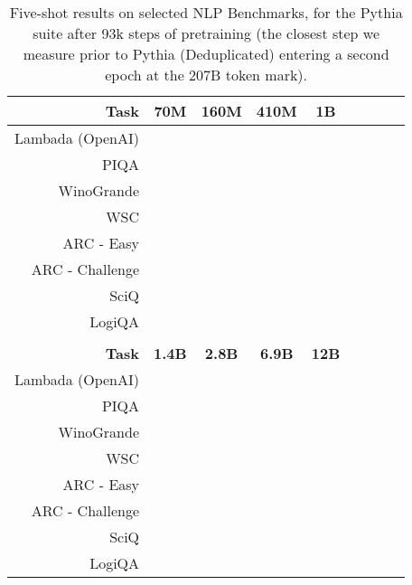 \documentclass{article}
\theoremstyle{plain}
\theoremstyle{definition}
\theoremstyle{remark}
\begin{document}
\begin{table}[H]
\centering
\begin{tabular}{rcccccccc}
\toprule
\textbf{Task} & \textbf{70M} & \textbf{160M} & \textbf{410M} & \textbf{1B} \\
\midrule
Lambada (OpenAI) &  &  &  &  \\
PIQA &  &  &  &  \\
WinoGrande &  &  &  &  \\
WSC &  &  &  &  \\
ARC - Easy &  &  &  &  \\
ARC - Challenge &  &  &  &  \\
SciQ &  &  &  &  \\
LogiQA &  &  &  &  \\
\bottomrule
\\
\textbf{Task} & \textbf{1.4B} & \textbf{2.8B} & \textbf{6.9B} & \textbf{12B} \\
\hline
Lambada (OpenAI) &  &  &  &  \\
PIQA &  &  &  &  \\
WinoGrande &  &  &  &  \\
WSC &  &  &  &  \\
ARC - Easy &  &  &  &  \\
ARC - Challenge &  &  &  &  \\
SciQ &  &  &  &  \\
LogiQA &  &  &  &  \\
\hline
\end{tabular}
\caption{Five-shot results on selected NLP Benchmarks, for the Pythia suite after 93k steps of pretraining (the closest step we measure prior to Pythia (Deduplicated) entering a second epoch at the 207B token mark).}
\end{table}
\end{document}
